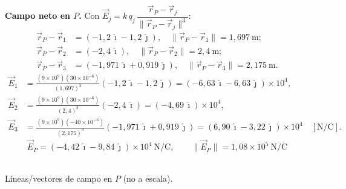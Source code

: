 \documentclass[12pt,letterpaper]{article}
\begin{document}
\noindent\textbf{Campo neto en $P$.} Con $\vec E_j=k\,q_j\,\dfrac{\vec r_P-\vec r_j}{\lVert\vec r_P-\vec r_j\rVert^{3}}$:
\begin{align*}
\vec r_P-\vec r_1&=(-1{,}2\,\hat\imath-1{,}2\,\hat\jmath),\quad \lVert\vec r_P-\vec r_1\rVert=1{,}697\ \mathrm{m};\\
\vec r_P-\vec r_2&=(-2{,}4\,\hat\imath),\quad \lVert\vec r_P-\vec r_2\rVert=2{,}4\ \mathrm{m};\\
\vec r_P-\vec r_3&=(-1{,}971\,\hat\imath+0{,}919\,\hat\jmath),\quad \lVert\vec r_P-\vec r_3\rVert=2{,}175\ \mathrm{m}.
\end{align*}
\begin{align*}
\vec E_1&=\frac{(9\times10^{9})(30\times10^{-6})}{(1{,}697)^{3}}(-1{,}2\,\hat\imath-1{,}2\,\hat\jmath)=(-6{,}63\,\hat\imath-6{,}63\,\hat\jmath)\times10^{4},\\[2pt]
\vec E_2&=\frac{(9\times10^{9})(30\times10^{-6})}{(2{,}4)^{3}}(-2{,}4\,\hat\imath)=(-4{,}69\,\hat\imath)\times10^{4},\\[2pt]
\vec E_3&=\frac{(9\times10^{9})(-40\times10^{-6})}{(2{,}175)^{3}}(-1{,}971\,\hat\imath+0{,}919\,\hat\jmath)=(6{,}90\,\hat\imath-3{,}22\,\hat\jmath)\times10^{4}\quad[\mathrm{N/C}].
\end{align*}
\[
\boxed{\ \vec E_P=(-4{,}42\,\hat\imath-9{,}84\,\hat\jmath)\times10^{4}\ \mathrm{N/C},\qquad \lVert\vec E_P\rVert=1{,}08\times10^{5}\ \mathrm{N/C}\ }
\]

\smallskip
\begin{center}
\\[-2pt]
{\scriptsize L\'ineas/vectores de campo en $P$ (no a escala).}
\end{center}
\end{document}
